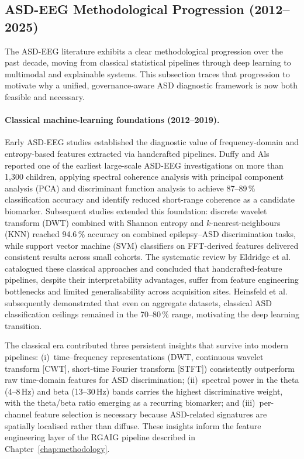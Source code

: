 \subsection{ASD-EEG Methodological Progression (2012--2025)}
\label{subsec:asd_eeg_progression}

The ASD-EEG literature exhibits a clear methodological progression over the past decade, moving from classical statistical pipelines through deep learning to multimodal and explainable systems. This subsection traces that progression to motivate why a unified, governance-aware ASD diagnostic framework is now both feasible and necessary.

\paragraph{Classical machine-learning foundations (2012--2019).}
Early ASD-EEG studies established the diagnostic value of frequency-domain and entropy-based features extracted via handcrafted pipelines. Duffy and Als~\cite{duffy2019eeg} reported one of the earliest large-scale ASD-EEG investigations on more than 1{,}300 children, applying spectral coherence analysis with principal component analysis (PCA) and discriminant function analysis to achieve 87--89\,\% classification accuracy and identify reduced short-range coherence as a candidate biomarker. Subsequent studies extended this foundation: discrete wavelet transform (DWT) combined with Shannon entropy and $k$-nearest-neighbours (KNN) reached 94.6\,\% accuracy on combined epilepsy--ASD discrimination tasks, while support vector machine (SVM) classifiers on FFT-derived features delivered consistent results across small cohorts. The systematic review by Eldridge et al.~\cite{eldridge2014asd} catalogued these classical approaches and concluded that handcrafted-feature pipelines, despite their interpretability advantages, suffer from feature engineering bottlenecks and limited generalisability across acquisition sites. Heinsfeld et al.~\cite{heinsfeld2018identification} subsequently demonstrated that even on aggregate datasets, classical ASD classification ceilings remained in the 70--80\,\% range, motivating the deep learning transition.

The classical era contributed three persistent insights that survive into modern pipelines: (i)~time--frequency representations (DWT, continuous wavelet transform [CWT], short-time Fourier transform [STFT]) consistently outperform raw time-domain features for ASD discrimination; (ii)~spectral power in the theta (4--8\,Hz) and beta (13--30\,Hz) bands carries the highest discriminative weight, with the theta/beta ratio emerging as a recurring biomarker; and (iii)~per-channel feature selection is necessary because ASD-related signatures are spatially localised rather than diffuse. These insights inform the feature engineering layer of the RGAIG pipeline described in Chapter~\ref{chap:methodology}.

